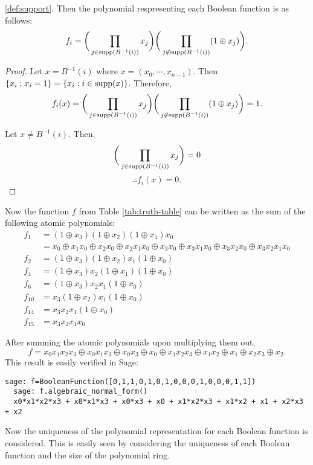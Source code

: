 \ref{def:support}. Then the polynomial respresenting each Boolean function
is as follows:
\begin{equation}\label{eqn:atomic-ANF}
  f_i=\bigg(\prod_{j\in {\rm supp}(B^{-1}(i))}x_j\bigg)
    \bigg(\prod_{j\not\in {\rm supp}(B^{-1}(i))}(1\oplus x_j)\bigg).
\end{equation}
\begin{proof}
  Let $x=B^{-1}(i)$ where $x=(x_0,\cdots,x_{n-1})$. Then
  $\{x_i:x_i=1\}=\{x_i:i\in {\rm supp}(x)\}$. Therefore,
  \[
  f_i(x)=\bigg(\prod_{j\in {\rm supp}(B^{-1}(i))}x_j\bigg)
    \bigg(\prod_{j\not\in {\rm supp}(B^{-1}(i))}(1\oplus x_j)\bigg)=1.
  \]

  Let $x\not=B^{-1}(i)$. Then,
  \[
  \bigg(\prod_{j\in {\rm supp}(B^{-1}(i))}x_j\bigg)=0
  \]\[
  \therefore f_i(x)=0.
  \]
\end{proof}

\par Now the function $f$ from Table \ref{tab:truth-table} can be written as
the sum of the following atomic polynomials:
\begin{align*}
  f_1   &=(1\oplus x_3)(1\oplus x_2)(1\oplus x_1)x_0\\
        &=x_0 \oplus x_1x_0 \oplus x_2x_0 \oplus x_2x_1x_0 \oplus
          x_3x_0 \oplus x_3x_1x_0 \oplus x_3x_2x_0 \oplus x_3x_2x_1x_0\\
  f_2   &=(1\oplus x_3)(1\oplus x_2)x_1(1\oplus x_0)\\
  f_4   &=(1\oplus x_3)x_2(1\oplus x_1)(1\oplus x_0)\\
  f_6   &=(1\oplus x_3)x_2x_1(1\oplus x_0)\\
  f_{10}&=x_3(1\oplus x_2)x_1(1\oplus x_0)\\
  f_{14}&=x_3x_2x_1(1\oplus x_0)\\
  f_{15}&=x_3x_2x_1x_0
\end{align*}
\par After summing the atomic polynomials upon multiplying them out,
\[
  f=x_0x_1x_2x_3\oplus x_0x_1x_3 \oplus x_0x_3 \oplus x_0 \oplus x_1x_2x_3
    \oplus x_1x_2\oplus x_1\oplus x_2x_3 \oplus x_2.
\]
This result is easily verified in Sage:
\begin{lstlisting}[gobble=1]
  sage: f=BooleanFunction([0,1,1,0,1,0,1,0,0,0,1,0,0,0,1,1])
  sage: f.algebraic_normal_form()
  x0*x1*x2*x3 + x0*x1*x3 + x0*x3 + x0 + x1*x2*x3 + x1*x2 + x1 + x2*x3 + x2
\end{lstlisting}

\par Now the uniqueness of the polynomial representation for each Boolean
function is considered. This is easily seen by considering the uniqueness of
each Boolean function and the size of the polynomial ring.

